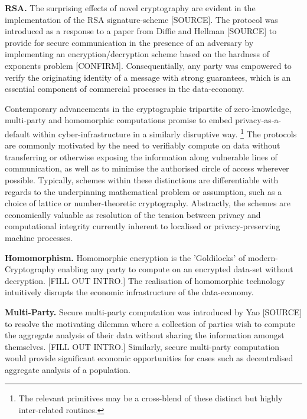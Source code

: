 \documentclass[twocolumn]{scrartcl}
\begin{document}
\textbf{RSA.} The surprising effects of novel cryptography are evident in the implementation of the RSA signature-scheme [SOURCE]. The protocol was introduced as a response to a paper from Diffie and Hellman [SOURCE] to provide for secure communication in the presence of an adversary by implementing an encryption/decryption scheme based on the hardness of exponents problem [CONFIRM]. Consequentially, any party was empowered to verify the originating identity of a message with strong guarantees, which is an essential component of commercial processes in the data-economy.

Contemporary advancements in the cryptographic tripartite of zero-knowledge, multi-party and homomorphic computations promise to embed privacy-as-a-default within cyber-infrastructure in a similarly disruptive way. \footnote{The relevant primitives may be a cross-blend of these distinct but highly inter-related routines.} The protocols are commonly motivated by the need to verifiably compute on data without transferring or otherwise exposing the information along vulnerable lines of communication, as well as to minimise the authorised circle of access wherever possible. Typically, schemes within these distinctions are differentiable with regards to the underpinning mathematical problem or assumption, such as a choice of lattice or number-theoretic cryptography. Abstractly, the schemes are economically valuable as resolution of the tension between privacy and computational integrity currently inherent to localised or privacy-preserving machine processes. 

\textbf{Homomorphism.} Homomorphic encryption is the 'Goldilocks' of modern-Cryptography enabling any party to compute on an encrypted data-set without decryption. [FILL OUT INTRO.] The realisation of homomorphic technology intuitively disrupts the economic infrastructure of the data-economy.

\textbf{Multi-Party.} Secure multi-party computation was introduced by Yao [SOURCE] to resolve the motivating dilemma where a collection of parties wish to compute the aggregate analysis of their data without sharing the information amongst themselves. [FILL OUT INTRO.] Similarly, secure multi-party computation would provide significant economic opportunities for cases such as decentralised aggregate analysis of a population.
\end{document}
